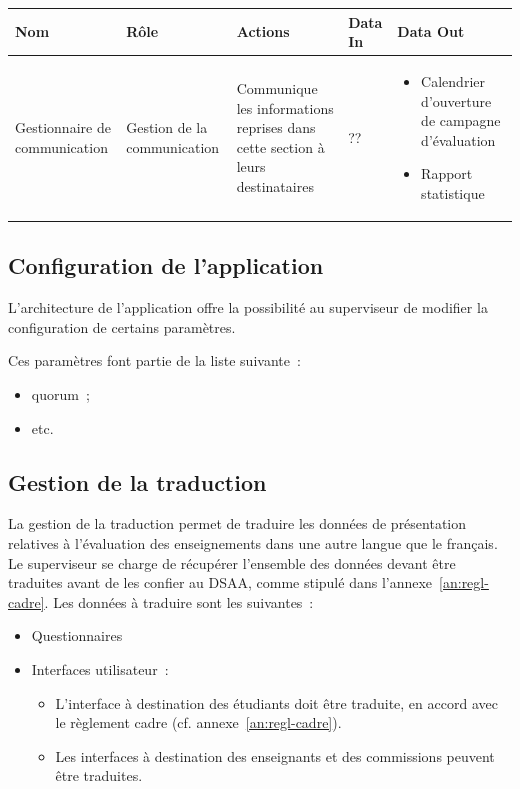\documentclass[a4paper,11pt]{report}
\begin{document}
\begin{tabularx}{\linewidth}{|X|X|X|X|X|} \hline
Nom & Rôle & Actions & Data In & Data Out \\ \hline 
Gestionnaire de communication & Gestion de la communication & Communique les informations reprises dans cette section à leurs destinataires & ?? & 
	\begin{itemize} 
		\item Calendrier d'ouverture de campagne d'évaluation
		\item Rapport statistique
	\end{itemize}
\\ \hline
\end{tabularx}





\subsection{Configuration de l'application}
L'architecture de l'application offre la possibilité au superviseur de modifier la configuration de certains paramètres.

\noindent Ces paramètres font partie de la liste suivante~:
\begin{itemize}
	\item quorum~;
	\item etc.
\end{itemize}





\subsection{Gestion de la traduction}
La gestion de la traduction permet de traduire les données de présentation relatives à l'évaluation des enseignements dans une autre langue que le français.
Le superviseur se charge de récupérer l'ensemble des données devant être traduites avant de les confier au DSAA, comme stipulé dans l'annexe~\ref{an:regl-cadre}.
Les données à traduire sont les suivantes~:
\begin{itemize}
	\item Questionnaires
	\item Interfaces utilisateur~:
	\begin{itemize}
		\item L'interface à destination des étudiants doit être traduite, en accord avec le règlement cadre (cf. annexe~\ref{an:regl-cadre}).
		\item Les interfaces à destination des enseignants et des commissions peuvent être traduites.
	\end{itemize}
\end{itemize}
\end{document}
